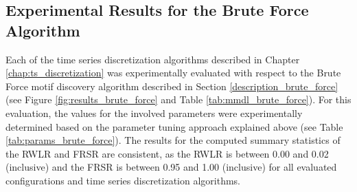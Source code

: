 \subsection*{Experimental Results for the Brute Force Algorithm}
Each of the time series discretization algorithms described in Chapter \ref{chap:ts_discretization} was experimentally evaluated with respect to the Brute Force motif discovery algorithm described in Section \ref{description_brute_force} (see Figure \ref{fig:results_brute_force} and Table \ref{tab:mmdl_brute_force}). For this evaluation, the values for the involved parameters were experimentally determined based on the parameter tuning approach explained above (see Table \ref{tab:params_brute_force}). \newline
The results for the computed summary statistics of the \ac{RWLR} and \ac{FRSR} are consistent, as the \ac{RWLR} is between 0.00 and 0.02 (inclusive) and the \ac{FRSR} is between 0.95 and 1.00 (inclusive) for all evaluated configurations and time series discretization algorithms.
\newpage
